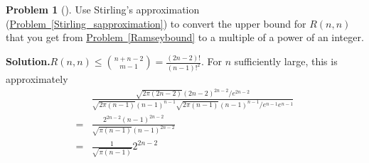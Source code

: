 \documentclass[10pt,]{book}
\theoremstyle{plain}
\theoremstyle{definition}
\newtheorem{activity}[project]{Problem}
\theoremstyle{definition}
\numberwithin{equation}{chapter}
\newcommand{\amp}{&}
\begin{document}
\begin{activity}[]\label{activity-85}
Use Stirling's approximation (\hyperref[Stirling_sapproximation]{Problem~\ref{Stirling_sapproximation}}) to convert the upper bound for \(R(n,n)\) that you get from \hyperref[Ramseybound]{Problem~\ref{Ramseybound}} to a multiple of a power of an integer.%
\par\medskip\noindent%
\textbf{Solution.}\quad \(R(n,n)\le \binom{n+n-2}{m-1}=\frac{(2n-2)!}{(n-1)!^2}\). For \(n\) sufficiently large, this is approximately%
\begin{align*}
\amp \frac{\sqrt{2\pi (2n-2)}(2n-2)^{2n-2}/e^{2n-2}}{ \sqrt{2 \pi (n-1)}(n-1)^{n-1}\sqrt{2 \pi
(n-1)}(n-1)^{n-1}/e^{n-1}e^{n-1}}\\
=\amp \frac{2^{2n-2}(n-1)^{2n-2}}{\sqrt{\pi
(n-1)}(n-1)^{2n-2}}\\
=\amp \frac{1}{\sqrt{\pi
(n-1)}}2^{2n-2}
\end{align*}
%
\end{activity}
\typeout{************************************************}
\typeout{************************************************}
\end{document}
